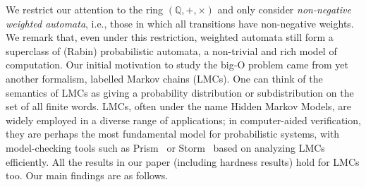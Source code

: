 \documentclass{lmcs}
\theoremstyle{plain}
\theoremstyle{definition}
\theoremstyle{remark}
\begin{document}
We restrict our attention to
the ring $(\mathbb Q, {+}, {\times})$ and
only consider \emph{non-negative weighted automata},
i.e., those in which all transitions have non-negative weights.
We remark that, even under this restriction,
weighted automata still form a superclass of
(Rabin) probabilistic automata, a non-trivial and rich model of computation.
Our initial motivation to study the big-O problem came from yet another formalism,
labelled Markov chains (LMCs).
One can think of the semantics of LMCs as giving a probability distribution
or subdistribution on the set of all finite words.
LMCs, often under the name Hidden Markov Models, are widely employed in
a diverse range of applications;
in computer-aided verification, they are perhaps the most fundamental model for
probabilistic systems, with model-checking tools such as Prism~\cite{KNP11} or
Storm~\cite{Storm} based on analyzing LMCs efficiently.
All the results in our paper (including hardness results) hold for LMCs too. Our main findings are as follows.
\end{document}
